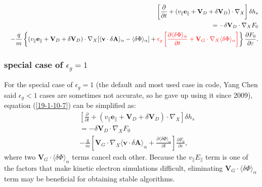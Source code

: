 \documentclass{llncs}
\newcommand{\tmcolor}[2]{{\color{#1}{#2}}}
\newcommand{\tmtexttt}[1]{\text{{\ttfamily{#1}}}}
\begin{document}
\begin{eqnarray}
  &  & \left[ \frac{\partial}{\partial t} + (v_{\parallel}
  \mathbf{e}_{\parallel} +\mathbf{V}_D + \delta \mathbf{V}_D) \cdot \nabla_X
  \right] \delta h_s \nonumber\\
  &  & = - \delta \mathbf{V}_D \cdot \nabla_X F_0 \nonumber\\
  &  & - \frac{q}{m} \left\{ (v_{\parallel} \mathbf{e}_{\parallel}
  +\mathbf{V}_D + \delta \mathbf{V}_D) \cdot \nabla_X [\langle \mathbf{v}
  \cdot \delta \mathbf{A} \rangle_{\alpha} - \langle \delta \Phi
  \rangle_{\alpha}] + \tmcolor{red}{\epsilon_g \left[ \frac{\partial \langle
  \delta \Phi \rangle_{\alpha}}{\partial t} +\mathbf{V}_G \cdot \nabla_X
  \langle \delta \Phi \rangle_{\alpha} \right]} \right\} \frac{\partial
  F_0}{\partial \varepsilon} .  \label{19-1-10-7}
\end{eqnarray}


\subsubsection{special case of $\epsilon_g = 1$}

For the special case of $\epsilon_g = 1$ (the default and most used case in
\tmtexttt{GEM} code, Yang Chen said $\epsilon_g < 1$ cases are sometimes not
accurate, so he gave up using it since 2009), equation (\ref{19-1-10-7}) can
be simplified as:
\begin{eqnarray}
  &  & \left[ \frac{\partial}{\partial t} + (v_{\parallel}
  \mathbf{e}_{\parallel} +\mathbf{V}_D + \delta \mathbf{V}_D) \cdot \nabla_X
  \right] \delta h_s \nonumber\\
  &  & = - \delta \mathbf{V}_D \cdot \nabla_X F_0 \nonumber\\
  &  & - \frac{q}{m} \left[ \mathbf{V}_G \cdot \nabla_X \langle \mathbf{v}
  \cdot \delta \mathbf{A} \rangle_{\alpha} + \frac{\partial \langle \delta
  \Phi \rangle_{\alpha}}{\partial t} \right] \frac{\partial F_0}{\partial
  \varepsilon},  \label{19-1-10-7m2}
\end{eqnarray}
where two $\mathbf{V}_G \cdot \langle \delta \Phi \rangle_{\alpha}$ terms
cancel each other. Because the $v_{\parallel} E_{\parallel}$ term is one of
the factors that make kinetic electron simulations difficult, eliminating
$\mathbf{V}_G \cdot \langle \delta \Phi \rangle_{\alpha}$ term may be
beneficial for obtaining stable algorithms.
\end{document}
